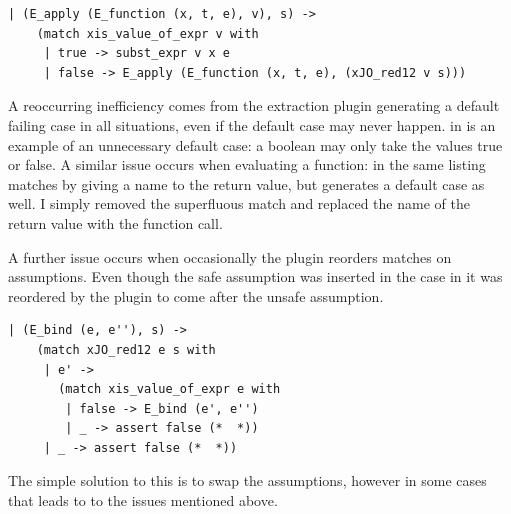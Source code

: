 \documentclass[12pt,twoside,notitlepage]{report}
\theoremstyle{plain}%
\theoremstyle{definition}
\theoremstyle{remark}
\begin{document}
\vspace{3mm}
\begin{minipage}{\linewidth}

\begin{lstlisting}[caption={OCaml fixed substitution case}, label={lst:ocamlfixsub}]
  | (E_apply (E_function (x, t, e), v), s) ->
    (match xis_value_of_expr v with
     | true -> subst_expr v x e
     | false -> E_apply (E_function (x, t, e), (xJO_red12 v s)))
\end{lstlisting}

\end{minipage}
A reoccurring inefficiency comes from the extraction plugin generating a default failing case in all situations, even if the default case may never happen.  in  is an example of an unnecessary default case: a boolean may only take the values true or false. A similar issue occurs when evaluating a function:   in the same listing matches by giving a name to the return value, but generates a default case as well. I simply removed the superfluous match and replaced the name of the return value with the function call.

A further issue occurs when occasionally the plugin reorders matches on assumptions. Even though the safe assumption was inserted in the case in  it was reordered by the plugin to come after the unsafe assumption.\vspace{2mm}

\begin{minipage}{\linewidth}
\begin{lstlisting}[caption={OCaml swapped assumptions}, label={lst:ocamlswapassume}]
  | (E_bind (e, e''), s) ->
    (match xJO_red12 e s with
     | e' ->
       (match xis_value_of_expr e with
        | false -> E_bind (e', e'')
        | _ -> assert false (*  *))
     | _ -> assert false (*  *))
\end{lstlisting}

\end{minipage}
The simple solution to this is to swap the assumptions, however in some cases that leads to to the issues mentioned above.
\end{document}
